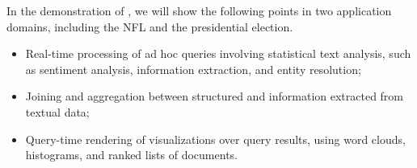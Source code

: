 
In the demonstration of \system, we will show the 
following points in two application domains, including the NFL
and the presidential election.
\begin{itemize}
\item Real-time processing of ad hoc queries 
involving statistical text analysis, such as sentiment analysis,
information extraction, and entity resolution;
\item Joining and aggregation between structured and information extracted
from textual data;
\item Query-time rendering of visualizations over query results, using 
word clouds, histograms, and ranked lists of documents.
\end{itemize}

